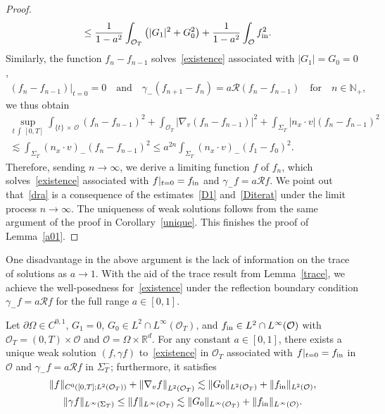 \documentclass[AHL,Unicode,longabstracts,published]{cedram}
\newcommand*\p{\partial}
\newcommand*\fin {f_{\rm in}}
\newcommand*\N {\mathbb{N}}
\newcommand*\R {\mathbb{R}}
\newcommand*\RR {\mathcal{R}}
\newcommand*\OO {\mathcal{O}}
\begin{document}
\begin{proof}
\begin{equation}
\begin{split}
\le \frac{1}{1-a^2} \int_{\OO_T}\left(|G_1|^2 + G_0^2\right) + \frac{1}{1-a^2} \int_{\OO}\fin^2 &.
\end{split}
\end{equation}
Similarly, the function $f_{n}-f_{n-1}$ solves~\eqref{existence} associated with $|G_1|=G_0=0$,
\begin{align*}
\left(f_{n}-f_{n-1}\right)|_{t=0}=0 \quad\text{and}\quad
\gamma_-\left(f_{n+1}-f_n\right)=a\RR\left(f_{n}-f_{n-1}\right)\quad\text{for}\quad n\in\N_+,
\end{align*}
we thus obtain
\begin{multline*}
\sup_{t\,\int\,[0,T]}\int_{\{t\}\,\times\,\OO} \left(f_{n}-f_{n-1}\right)^2 + \int_{\OO_T} \left|\nabla_v\left(f_{n}-f_{n-1}\right)\right|^2 +\int_{\Sigma_T} \left|n_x\cdot v\right|\left(f_{n}-f_{n-1}\right)^2\\
\lesssim \int_{\Sigma_T} (n_x\cdot v)_-\left(f_{n}-f_{n-1}\right)^2
\le a^{2n}\int_{\Sigma_T} (n_x\cdot v)_-\left(f_{1}-f_{0}\right)^2.
\end{multline*}
Therefore, sending $n\rightarrow\infty$, we derive a limiting function $f$ of $f_n$, which solves~\eqref{existence} associated with $f|_{t=0}=\fin$ and $\gamma_-f=a\RR f$. We point out that~\eqref{dra} is a consequence of the estimates~\eqref{D1} and~\eqref{Diterat} under the limit process $n\rightarrow\infty$. The uniqueness of weak solutions follows from the same argument of the proof in Corollary~\ref{unique}. This finishes the proof of Lemma~\ref{a01}.
\end{proof}

One disadvantage in the above argument is the lack of information on the trace of solutions as $a\rightarrow1$. With the aid of the trace result from Lemma~\ref{trace}, we achieve the well-posedness for~\eqref{existence} under the reflection boundary condition $\gamma_-f=a\RR f$ for the full range $a\in[0,1]$.

\begin{coro}\label{globalre}
Let $\p\Omega\in C^{0,1}$, $G_1=0$, $G_0\in L^2\cap L^\infty(\OO_T)$, and $\fin\in L^2\cap L^\infty(\OO)$ with $\OO_T=(0,T)\times\OO$ and $\OO=\Omega\times\R^d$. For any constant $a\in[0,1]$, there exists a unique weak solution $(f,\gamma f)$ to~\eqref{existence} in $\OO_T$ associated with $f|_{t=0}=\fin$ in $\OO$ and $\gamma_-f=a\RR f$ in $\Sigma_T^-$; furthermore, it satisfies
\begin{multline}\label{drglobal}
\|f\|_{C^0\left([0,T];L^2(\OO_T)\right)} + \left\|\nabla_vf\right\|_{L^2(\OO_T)}
\lesssim \|G_0\|_{L^2(\OO_T)} + \|\fin\|_{L^2(\OO)}, \\
\|\gamma f\|_{L^\infty(\Sigma_T)}
\le\|f\|_{L^\infty(\OO_T)}
\lesssim \|G_0\|_{L^\infty(\OO_T)} + \|\fin\|_{L^\infty(\OO)}.
\end{multline}
\end{coro}
\end{document}
